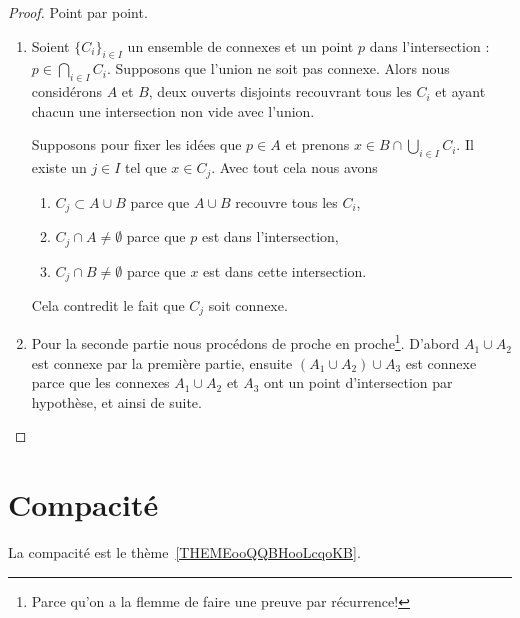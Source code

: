 \begin{proof}
    Point par point.
    \begin{enumerate}
        \item
    Soient \( \{ C_i \}_{i\in I}\) un ensemble de connexes et un point \( p\) dans l'intersection : \( p\in\bigcap_{i\in I}C_i\). Supposons que l'union ne soit pas connexe. Alors nous considérons \( A\) et \( B\), deux ouverts disjoints recouvrant tous les \( C_i\) et ayant chacun une intersection non vide avec l'union.

    Supposons pour fixer les idées que \( p\in A\) et prenons \( x\in B\cap\bigcup_{i\in I}C_i\). Il existe un \( j\in I\) tel que \( x\in C_j\). Avec tout cela nous avons
    \begin{enumerate}
        \item
            \( C_j\subset A\cup B\) parce que \(A \cup B\) recouvre tous les \( C_i \),
        \item
            \( C_j\cap A\neq \emptyset\) parce que \( p\) est dans l'intersection,
        \item
            \( C_j\cap B\neq\emptyset\) parce que \( x\) est dans cette intersection.
    \end{enumerate}
    Cela contredit le fait que \( C_j\) soit connexe.

\item

    Pour la seconde partie nous procédons de proche en proche\footnote{Parce qu'on a la flemme de faire une preuve par récurrence!}. D'abord \( A_1\cup A_2\) est connexe par la première partie, ensuite \( (A_1\cup A_2)\cup A_3\) est connexe parce que les connexes \( A_1\cup A_2\) et \( A_3\) ont un point d'intersection par hypothèse, et ainsi de suite.
    \end{enumerate}
\end{proof}


\section{Compacité}

La compacité est le thème~\ref{THEMEooQQBHooLcqoKB}.


